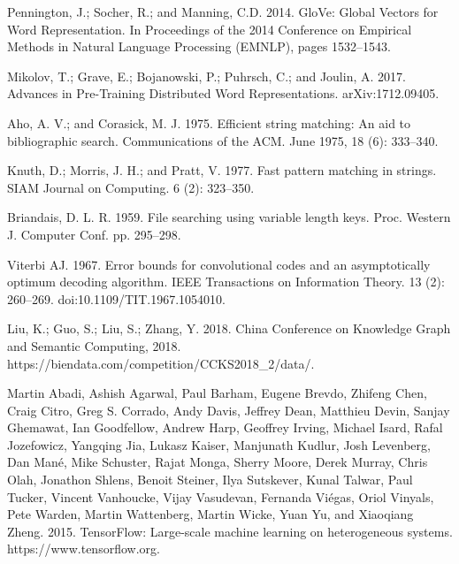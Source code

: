 \documentclass[letterpaper]{article} %
\begin{document}
\smallskip \noindent
Pennington, J.; Socher, R.; and Manning, C.D. 2014. GloVe: Global Vectors for Word Representation. In Proceedings of the 2014 Conference on Empirical Methods in Natural Language Processing (EMNLP), pages 1532–1543. 

\smallskip \noindent
Mikolov, T.; Grave, E.; Bojanowski, P.; Puhrsch, C.; and Joulin, A. 2017. Advances in Pre-Training Distributed Word Representations. arXiv:1712.09405. 

\smallskip \noindent
Aho, A. V.; and Corasick, M. J. 1975. Efficient string matching: An aid to bibliographic search. Communications of the ACM. June 1975, 18 (6): 333–340.

\smallskip \noindent
Knuth, D.; Morris, J. H.; and Pratt, V. 1977. Fast pattern matching in strings. SIAM Journal on Computing. 6 (2): 323–350. 

\smallskip \noindent
Briandais, D. L. R. 1959. File searching using variable length keys. Proc. Western J. Computer Conf. pp. 295–298. 

\smallskip \noindent
Viterbi AJ. 1967. Error bounds for convolutional codes and an asymptotically optimum decoding algorithm. IEEE Transactions on Information Theory. 13 (2): 260–269. doi:10.1109/TIT.1967.1054010. 

\smallskip \noindent
Liu, K.; Guo, S.; Liu, S.; Zhang, Y. 2018. China Conference on Knowledge Graph and Semantic Computing, 2018. https://biendata.com/competition/CCKS2018\_2/data/. 

\smallskip \noindent
Martin Abadi, Ashish Agarwal, Paul Barham, Eugene Brevdo, Zhifeng Chen, Craig Citro, Greg S. Corrado, Andy Davis, Jeffrey Dean, Matthieu Devin, Sanjay Ghemawat, Ian Goodfellow, Andrew Harp, Geoffrey Irving, Michael Isard, Rafal Jozefowicz, Yangqing Jia, Lukasz Kaiser, Manjunath Kudlur, Josh Levenberg, Dan Mané, Mike Schuster, Rajat Monga, Sherry Moore, Derek Murray, Chris Olah, Jonathon Shlens, Benoit Steiner, Ilya Sutskever, Kunal Talwar, Paul Tucker, Vincent Vanhoucke, Vijay Vasudevan, Fernanda Viégas, Oriol Vinyals, Pete Warden, Martin Wattenberg, Martin Wicke, Yuan Yu, and Xiaoqiang Zheng. 2015. TensorFlow: Large-scale machine learning on heterogeneous systems. https://www.tensorflow.org.
\end{document}
